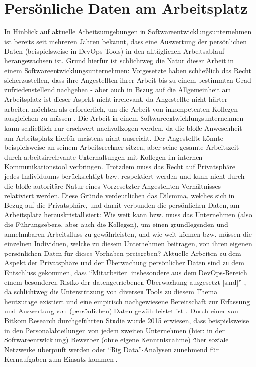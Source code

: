 \section{Persönliche Daten am Arbeitsplatz} \label{personaldata}
In Hinblick auf aktuelle Arbeitsumgebungen in Softwareentwicklungsunternehmen ist bereits seit mehreren Jahren bekannt, dass eine Auswertung der persönlichen Daten (beispielsweise in DevOps-Tools) in den alltäglichen Arbeitsablauf herangewachsen ist. Grund hierfür ist schlichtweg die Natur dieser Arbeit in einem Softwareentwicklungsunternehmen: \newline
Vorgesetzte haben schließlich das Recht sicherzustellen, dass ihre Angestellten ihrer Arbeit bis zu einem bestimmten Grad zufriedenstellend nachgehen \cite{Miller:2000aa} - aber auch in Bezug auf die Allgemeinheit am Arbeitsplatz ist dieser Aspekt nicht irrelevant, da Angestellte nicht härter arbeiten möchten als erforderlich, um die Arbeit von inkompetenten
Kollegen ausgleichen zu müssen \cite{Miller:2000aa}. Die Arbeit in einem Softwareentwicklungsunternehmen kann schließlich nur erschwert nachvollzogen werden, da die bloße Anwesenheit am Arbeitsplatz hierfür meistens nicht ausreicht. Der Angestellte könnte beispielsweise an seinem Arbeitsrechner sitzen, aber seine gesamte Arbeitszeit durch arbeitsirrelevante
Unterhaltungen mit Kollegen im internen Kommunikationstool verbringen. \newline Trotzdem muss das Recht auf Privatsphäre jedes Individuums berücksichtigt bzw. respektiert werden und kann nicht durch die bloße autoritäre Natur eines Vorgesetzter-Angestellten-Verhältnisses relativiert werden. \newline 
Diese Gründe verdeutlichen das Dilemma, welches sich in Bezug auf die Privatsphäre, und damit verbunden die persönlichen Daten, am Arbeitsplatz herauskristallisiert: Wie weit kann bzw. muss das Unternehmen (also die Führungsebene, aber auch die Kollegen), um einen grundlegenden und annehmbaren Arbeitsfluss zu gewährleisten, und wie weit können bzw. müssen die
einzelnen Individuen, welche zu diesem Unternehmen beitragen, von ihren eigenen persönlichen Daten für dieses Vorhaben preisgeben? \newline
Aktuelle Arbeiten zu dem Aspekt der Privatsphäre und der Überwachung persönlicher Daten sind zu dem Entschluss gekommen, dass \enquote{Mitarbeiter [insbesondere aus dem DevOps-Bereich] einem besonderen Risiko der datengetriebenen Überwachung ausgesetzt [sind]} \cite{Federrath:2020aa}, da schlichtweg die Unterstützung von diversen Tools zu diesem Thema heutzutage
existiert und eine empirisch nachgewiesene Bereitschaft zur Erfassung und Auswertung von (persönlichen) Daten gewährleistet ist \cite{Federrath:2020aa}: Durch einer von Bitkom Research durchgeführten Studie wurde 2015 erwiesen, dass beispielsweise in den Personalabteilungen von jedem zweiten Unternehmen (hier: in der Softwareentwicklung) Bewerber (ohne eigene Kenntnisnahme)
über soziale Netzwerke überprüft werden oder \enquote{Big Data}-Analysen zunehmend für Kernaufgaben zum Einsatz kommen \cite{Research:2015aa}.

